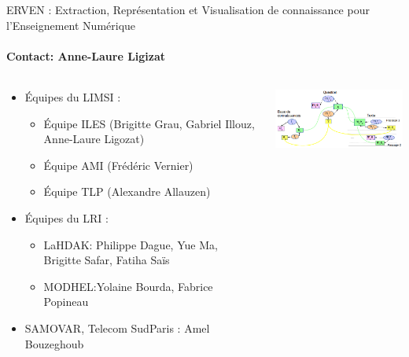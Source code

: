 \begin{frame}{ERVEN : Extraction, Représentation et Visualisation de connaissance pour
l'Enseignement Numérique}
\framesubtitle{Contact: Anne-Laure Ligizat}
{\color{blue} }
\begin{columns}
  \begin{column}{7cm}
    \hspace*{-1cm}
    \begin{itemize}
    \item Équipes du LIMSI :
      \begin{itemize}
      \item
        Équipe ILES (Brigitte Grau, Gabriel Illouz, Anne-Laure Ligozat)
      \item
        Équipe AMI (Frédéric Vernier)
      \item
        Équipe TLP (Alexandre Allauzen) 
      \end{itemize}
    \item Équipes du LRI : 
      \begin{itemize}
      \item LaHDAK: Philippe Dague,
        Yue Ma, Brigitte Safar, Fatiha Saïs 
      \item MODHEL:Yolaine Bourda, Fabrice Popineau
      \end{itemize}
    \item SAMOVAR, Telecom SudParis :
      Amel Bouzeghoub 
    \end{itemize}
  \end{column}
  \begin{column}{6cm}
    \includegraphics[width=6cm]{Images/education.png}
  \end{column}
\end{columns}
\end{frame}


